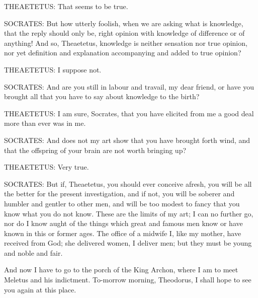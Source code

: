 THEAETETUS: That seems to be true.

SOCRATES: But how utterly foolish, when we are asking what is knowledge,
that the reply should only be, right opinion with knowledge of
difference or of anything! And so, Theaetetus, knowledge is neither
sensation nor true opinion, nor yet definition and explanation
accompanying and added to true opinion?

THEAETETUS: I suppose not.

SOCRATES: And are you still in labour and travail, my dear friend, or
have you brought all that you have to say about knowledge to the birth?

THEAETETUS: I am sure, Socrates, that you have elicited from me a good
deal more than ever was in me.

SOCRATES: And does not my art show that you have brought forth wind, and
that the offspring of your brain are not worth bringing up?

THEAETETUS: Very true.

SOCRATES: But if, Theaetetus, you should ever conceive afresh, you will
be all the better for the present investigation, and if not, you will be
soberer and humbler and gentler to other men, and will be too modest
to fancy that you know what you do not know. These are the limits of my
art; I can no further go, nor do I know aught of the things which great
and famous men know or have known in this or former ages. The office
of a midwife I, like my mother, have received from God; she delivered
women, I deliver men; but they must be young and noble and fair.

And now I have to go to the porch of the King Archon, where I am to meet
Meletus and his indictment. To-morrow morning, Theodorus, I shall hope
to see you again at this place.





